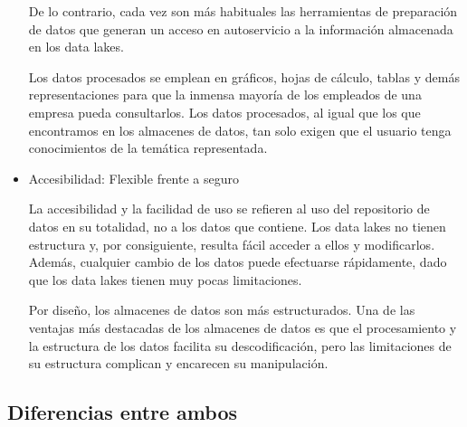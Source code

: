 \documentclass[preprint,12pt]{elsarticle}
\begin{document}
\begin{itemize}
De lo contrario, cada vez son más habituales las herramientas de preparación de datos que generan un acceso en autoservicio a la información almacenada en los data lakes.

Los datos procesados se emplean en gráficos, hojas de cálculo, tablas y demás representaciones para que la inmensa mayoría de los empleados de una empresa pueda consultarlos. Los datos procesados, al igual que los que encontramos en los almacenes de datos, tan solo exigen que el usuario tenga conocimientos de la temática representada.

\item Accesibilidad: Flexible frente a seguro

La accesibilidad y la facilidad de uso se refieren al uso del repositorio de datos en su totalidad, no a los datos que contiene. Los data lakes no tienen estructura y, por consiguiente, resulta fácil acceder a ellos y modificarlos. Además, cualquier cambio de los datos puede efectuarse rápidamente, dado que los data lakes tienen muy pocas limitaciones.

Por diseño, los almacenes de datos son más estructurados. Una de las ventajas más destacadas de los almacenes de datos es que el procesamiento y la estructura de los datos facilita su descodificación, pero las limitaciones de su estructura complican y encarecen su manipulación.

\end{itemize}

\subsection{Diferencias entre ambos}
\end{document}
